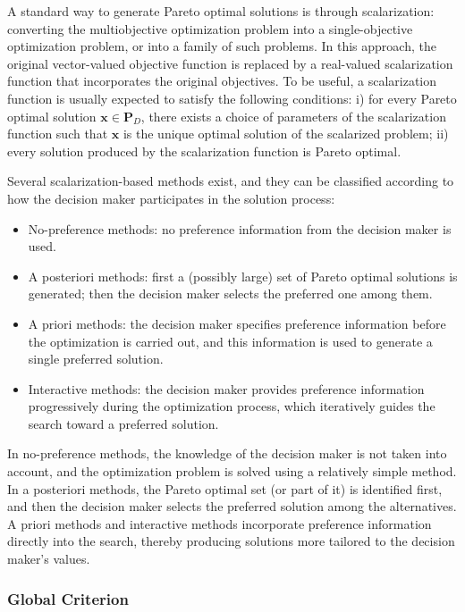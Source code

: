 A standard way to generate Pareto optimal solutions is through scalarization: converting the multiobjective optimization problem into a single-objective optimization problem, or into a family of such problems. In this approach, the original vector-valued objective function is replaced by a real-valued scalarization function that incorporates the original objectives. To be useful, a scalarization function is usually expected to satisfy the following conditions: i) for every Pareto optimal solution $\mathbf{x} \in \mathbf{P}_D$, there exists a choice of parameters of the scalarization function such that $\mathbf{x}$ is the unique optimal solution of the scalarized problem; ii) every solution produced by the scalarization function is Pareto optimal.

Several scalarization-based methods exist, and they can be classified according to how the decision maker participates in the solution process:

\begin{itemize}
\item No-preference methods: no preference information from the decision maker is used.
\item A posteriori methods: first a (possibly large) set of Pareto optimal solutions is generated; then the decision maker selects the preferred one among them.
\item A priori methods: the decision maker specifies preference information before the optimization is carried out, and this information is used to generate a single preferred solution.
\item Interactive methods: the decision maker provides preference information progressively during the optimization process, which iteratively guides the search toward a preferred solution.
\end{itemize}

In no-preference methods, the knowledge of the decision maker is not taken into account, and the optimization problem is solved using a relatively simple method. In a posteriori methods, the Pareto optimal set (or part of it) is identified first, and then the decision maker selects the preferred solution among the alternatives. A priori methods and interactive methods incorporate preference information directly into the search, thereby producing solutions more tailored to the decision maker's values.

\subsubsection{Global Criterion}
\label{sub:multiobjective_global_criterion}

